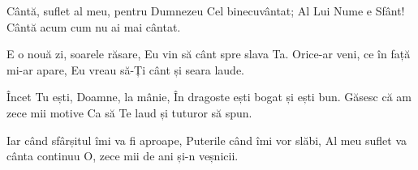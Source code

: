 \beginchorus
Cântă, suflet al meu, pentru Dumnezeu
Cel binecuvântat;
Al Lui Nume e Sfânt!
Cântă acum cum nu ai mai cântat.
\endchorus

\beginverse
E o nouă zi, soarele răsare,
Eu vin să cânt spre slava Ta.
Orice-ar veni, ce în față mi-ar apare,
Eu vreau să-Ți cânt și seara laude.
\endverse

\beginverse
Încet Tu ești, Doamne, la mânie,
În dragoste ești bogat și ești bun.
Găsesc că am zece mii motive
Ca să Te laud și tuturor să spun.
\endverse

\beginverse
Iar când sfârșitul îmi va fi aproape,
Puterile când îmi vor slăbi,
Al meu suflet va cânta continuu
O, zece mii de ani și-n veșnicii.
\endverse
\endsong